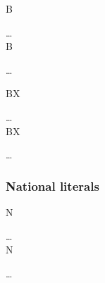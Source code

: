 \begin{syntax}
  \begin{1=}
    B\textquotesingle
    \begin{0-1}
      \character
    \end{0-1}\ldots
    \textquotesingle \\
    
    B\textquotedbl
    \begin{0-1}
      \character
    \end{0-1}\ldots
    \textquotedbl
  \end{1=}
\end{syntax}

\begin{syntax}
  \begin{1=}
    BX\textquotesingle
    \begin{0-1}
      \hexcharacter
    \end{0-1}\ldots
    \textquotesingle \\
    
    BX\textquotedbl
    \begin{0-1}
      \hexcharacter
    \end{0-1}\ldots
    \textquotedbl
  \end{1=}
\end{syntax}

\subsubsection{National literals}

\begin{syntax}
  \begin{1=}
    N\textquotesingle
    \begin{0-1}
      \character
    \end{0-1}\ldots
    \textquotesingle \\
    
    N\textquotedbl
    \begin{0-1}
      \character
    \end{0-1}\ldots
    \textquotedbl \\

    \\

  \end{1=}
\end{syntax}

